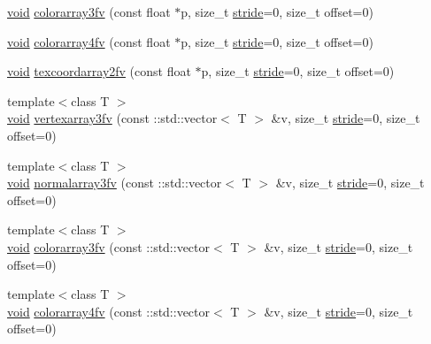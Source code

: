 \begin{DoxyCompactItemize}
\item 
\hyperlink{namespacetrimesh_a784ddfd979e1c579bda795a8edfc3f43}{void} \hyperlink{classtrimesh_1_1GLManager_ab63b2ecadb2b573ff8f23a75350635df}{colorarray3fv} (const float $\ast$p, size\+\_\+t \hyperlink{namespacetrimesh_adbcc86014e77656be1a9df7ecaae5f2f}{stride}=0, size\+\_\+t offset=0)
\item 
\hyperlink{namespacetrimesh_a784ddfd979e1c579bda795a8edfc3f43}{void} \hyperlink{classtrimesh_1_1GLManager_a5428a45c51c6e002f99f12fa4565eb87}{colorarray4fv} (const float $\ast$p, size\+\_\+t \hyperlink{namespacetrimesh_adbcc86014e77656be1a9df7ecaae5f2f}{stride}=0, size\+\_\+t offset=0)
\item 
\hyperlink{namespacetrimesh_a784ddfd979e1c579bda795a8edfc3f43}{void} \hyperlink{classtrimesh_1_1GLManager_a86146cc09b091ef1f5486e90072db78f}{texcoordarray2fv} (const float $\ast$p, size\+\_\+t \hyperlink{namespacetrimesh_adbcc86014e77656be1a9df7ecaae5f2f}{stride}=0, size\+\_\+t offset=0)
\item 
{\footnotesize template$<$class T $>$ }\\\hyperlink{namespacetrimesh_a784ddfd979e1c579bda795a8edfc3f43}{void} \hyperlink{classtrimesh_1_1GLManager_ae7a26205c88e388ad0a89275017082af}{vertexarray3fv} (const \+::std\+::vector$<$ T $>$ \&v, size\+\_\+t \hyperlink{namespacetrimesh_adbcc86014e77656be1a9df7ecaae5f2f}{stride}=0, size\+\_\+t offset=0)
\item 
{\footnotesize template$<$class T $>$ }\\\hyperlink{namespacetrimesh_a784ddfd979e1c579bda795a8edfc3f43}{void} \hyperlink{classtrimesh_1_1GLManager_acba59f3ebb1e80ce6d0c68596c8234bb}{normalarray3fv} (const \+::std\+::vector$<$ T $>$ \&v, size\+\_\+t \hyperlink{namespacetrimesh_adbcc86014e77656be1a9df7ecaae5f2f}{stride}=0, size\+\_\+t offset=0)
\item 
{\footnotesize template$<$class T $>$ }\\\hyperlink{namespacetrimesh_a784ddfd979e1c579bda795a8edfc3f43}{void} \hyperlink{classtrimesh_1_1GLManager_a9ece72924cbc94c5b649dcdac1bb2f29}{colorarray3fv} (const \+::std\+::vector$<$ T $>$ \&v, size\+\_\+t \hyperlink{namespacetrimesh_adbcc86014e77656be1a9df7ecaae5f2f}{stride}=0, size\+\_\+t offset=0)
\item 
{\footnotesize template$<$class T $>$ }\\\hyperlink{namespacetrimesh_a784ddfd979e1c579bda795a8edfc3f43}{void} \hyperlink{classtrimesh_1_1GLManager_a7e76c5d67ea03cc3ee42eff380cbcda4}{colorarray4fv} (const \+::std\+::vector$<$ T $>$ \&v, size\+\_\+t \hyperlink{namespacetrimesh_adbcc86014e77656be1a9df7ecaae5f2f}{stride}=0, size\+\_\+t offset=0)

\end{DoxyCompactItemize}
